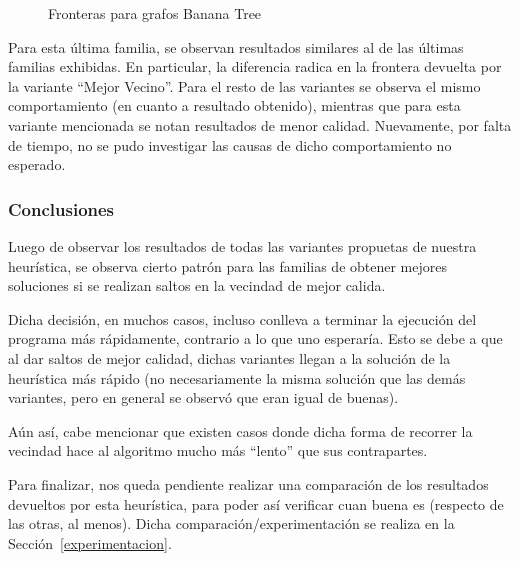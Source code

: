 \begin{figure}[H]
    \centering
    \fontsize{7}{10}\selectfont
    \resizebox{0.8\textwidth}{!}{}
    \caption{Fronteras para grafos Banana Tree}
\end{figure}

\par Para esta \'ultima familia, se observan resultados similares al de las \'ultimas
    familias exhibidas. En particular, la diferencia radica en la frontera devuelta
    por la variante ``Mejor Vecino''. Para el resto de las variantes se observa el
    mismo comportamiento (en cuanto a resultado obtenido), mientras que para esta
    variante mencionada se notan resultados de menor calidad. Nuevamente, por
    falta de tiempo, no se pudo investigar las causas de dicho comportamiento
    no esperado.

\subsubsection{Conclusiones}
\par Luego de observar los resultados de todas las variantes propuetas de nuestra
    heur\'istica, se observa cierto patr\'on para las familias de obtener
    mejores soluciones si se realizan saltos en la vecindad de mejor calida.

\par Dicha decisi\'on, en muchos casos, incluso conlleva a terminar la ejecuci\'on
    del programa m\'as r\'apidamente, contrario a lo que uno esperar\'ia. Esto
    se debe a que al dar saltos de mejor calidad, dichas variantes llegan a
    la soluci\'on de la heur\'istica m\'as r\'apido (no necesariamente la
    misma soluci\'on que las dem\'as variantes, pero en general se observ\'o
    que eran igual de buenas).

\par A\'un as\'i, cabe mencionar que existen casos donde dicha forma de recorrer
    la vecindad hace al algoritmo mucho m\'as ``lento'' que sus contrapartes.

\par Para finalizar, nos queda pendiente realizar una comparaci\'on de los
    resultados devueltos por esta heur\'istica, para poder as\'i verificar
    cuan buena es (respecto de las otras, al menos). Dicha comparaci\'on/experimentaci\'on
    se realiza en la Secci\'on~\ref{experimentacion}.

